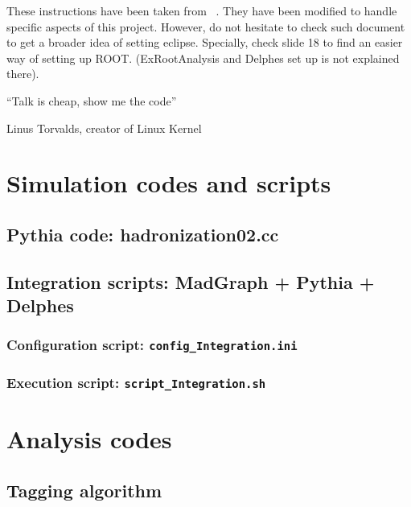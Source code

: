 \documentclass[12pt, oneside]{book}              %
\begin{document}
These instructions have been taken from ~\cite{eclipse}. They have
been modified to handle specific aspects of this project. However, do not
hesitate to check such document to get a broader idea of setting eclipse.
Specially, check slide 18 to find an easier way of setting up ROOT. 
(ExRootAnalysis and Delphes set up is not explained there).

\begin{appendices}

\epigraph{\textquotedblleft Talk is cheap, show me the code\textquotedblright}{Linus Torvalds, creator of Linux Kernel}

\chapter[Simulation codes]{Simulation codes and scripts}\label{App:Simulation_codes}
\section[Pythia code]{Pythia code: hadronization02.cc}\label{App:hadronization02.cc}

\newpage
\section[Integration scripts]{Integration scripts: MadGraph + Pythia + Delphes}\label{App:scripts}
\subsection{Configuration script: \texttt{config\_Integration.ini}}\label{sub:Configuration_script}

\subsection{Execution script: \texttt{script\_Integration.sh}}\label{sub:Execution_script}


\chapter[Analysis codes]{Analysis codes}\label{App:Analysis_codes}
\section[Tagging algorithm]{Tagging algorithm}\label{App:Tagging_code}


\end{appendices}
\end{document}
